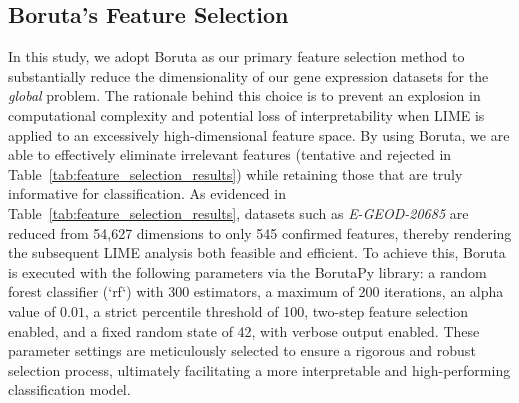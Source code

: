  \subsection{Boruta's Feature Selection}
In this study, we adopt Boruta as our primary feature selection method to substantially reduce the dimensionality of our gene expression datasets for the \textit{global} problem. The rationale behind this choice is to prevent an explosion in computational complexity and potential loss of interpretability when LIME is applied to an excessively high-dimensional feature space. By using Boruta, we are able to effectively eliminate irrelevant features (tentative and rejected in Table~\ref{tab:feature_selection_results}) while retaining those that are truly informative for classification. As evidenced in Table~\ref{tab:feature_selection_results}, datasets such as \textit{E-GEOD-20685} are reduced from 54,627 dimensions to only 545 confirmed features, thereby rendering the subsequent LIME analysis both feasible and efficient. To achieve this, Boruta is executed with the following parameters via the BorutaPy library: a random forest classifier (`rf`) with 300 estimators, a maximum of 200 iterations, an alpha value of $0.01$, a strict percentile threshold of 100, two-step feature selection enabled, and a fixed random state of 42, with verbose output enabled. These parameter settings are meticulously selected to ensure a rigorous and robust selection process, ultimately facilitating a more interpretable and high-performing classification model.

